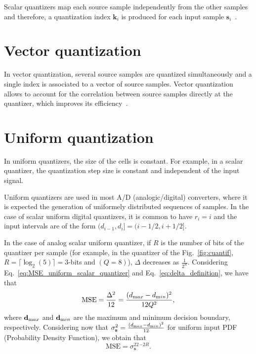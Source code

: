 Scalar quantizers map each source sample independently from the other
samples and therefore, a quantization index ${\mathbf k}_i$ is
produced for each input sample ${\mathbf
  s}_i$~\cite{vruiz__scalar_quantization}.

\section{Vector quantization}

In vector quantization, several source samples are quantized
simultaneously and a single index is associated to a vector of source
samples. Vector quantization allows to account for the correlation
between source samples directly at the quantizer, which improves its
efficiency~\cite{duhamel2009joint}.

\section{Uniform quantization}

In uniform quantizers, the size of the cells is constant. For example,
in a scalar quantizer, the quantization step size is constant and
independent of the input signal.

Uniform quantizers are used in most A/D (analogic/digital) converters,
where it is expected the generation of uniformely distributed
sequences of samples. In the case of scalar uniform digital
quantizers, it is common to have $r_i=i$ and the input intervals are
of the form $(d_{i-1},d_i]=(i-1/2,i+1/2]$.

In the case of analog scalar uniform quantizer, if $R$ is the number
of bits of the quantizer per sample (for example, in the quantizer of
the Fig.~\ref{fig:cuantif}, $R=\lceil\log_2(5)\rceil=3$-bits and
$(Q=8)$), $\Delta$ decreases as $\frac{1}{2^R}$. Considering
Eq.~\ref{eq:MSE_uniform_scalar_quantizer} and
Eq.~\ref{eq:delta_definition}, we have that
\begin{equation}
  \text{MSE} = \frac{\Delta^2}{12} = \frac{(d_{\text max}-d_{\text
      min})^2}{12Q^2},
\end{equation}
where ${\mathbf d}_{\text max}$ and ${\mathbf d}_{\text min}$ are the
maximum and minimum decision boundary, respectively. Considering now
that $\sigma^2_{\mathbf s}=\frac{(d_{\text max}-d_{\text min})^2}{12}$
for uniform input PDF (Probability Density Function), we obtain that
\begin{equation}
  \text{MSE} = \sigma_{\mathbf s}^22^{-2R}.
\end{equation}

